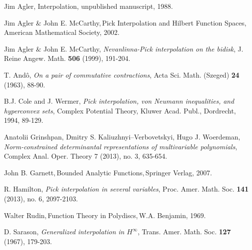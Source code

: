 \documentclass[11pt, reqno]{amsart}
\numberwithin{equation}{section}
\theoremstyle{definition}
\theoremstyle{remark}
\theoremstyle{plain}
\begin{document}
\begin{thebibliography}{1}
 Jim Agler, Interpolation, unpublished manuscript, 1988.

 Jim Agler $\&$ John E. McCarthy,\,Pick Interpolation and Hilbert Function Spaces,
\,American Mathematical Society, 2002.

 Jim Agler $\&$ John E. McCarthy, {\em Nevanlinna-Pick interpolation on the bidisk}, J. Reine Angew. Math.
{\bf 506} (1999), 191-204.

 T. And\^{o}, {\em On a pair of commutative contractions}, Acta Sci. Math. (Szeged) {\bf 24} (1963), 88-90.

 B.J. Cole and J. Wermer, {\em Pick interpolation, von Neumann inequalities, and hyperconvex sets},
Complex Potential Theory, Kluwer Acad. Publ., Dordrecht, 1994, 89-129.

 Anatolii Grinshpan, Dmitry S. Kaliuzhnyi--Verbovetskyi, Hugo J. Woerdeman,
{\em Norm-constrained determinantal representations of multivariable polynomials}, Complex Anal. Oper. Theory 7 (2013),
no. 3, 635-654.

 John B. Garnett,\,Bounded Analytic Functions,\,Springer Verlag, 2007.

 R. Hamilton, {\em Pick interpolation in several variables}, Proc. Amer. Math. Soc. {\bf 141} (2013),
no. 6, 2097-2103.

 Walter Rudin,\,Function Theory in Polydiscs,\,W.A. Benjamin, 1969.

 D. Sarason, {\em Generalized interpolation in $H^{\infty}$}, Trans. Amer. Math. Soc.
{\bf 127} (1967), 179-203.

\end{thebibliography}
\end{document}
